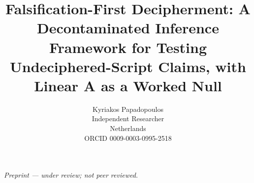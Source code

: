 
\ifanon
  \newcommand{\artref}{the artifact}
  \newcommand{\artobj}{the artifact}
\else
  \newcommand{\artref}{logos v0.1.0}
  \newcommand{\artobj}{the logos artifact (v0.1.0)}
\fi

\ifanon
\else
\fi

\title{Falsification-First Decipherment: A Decontaminated Inference
Framework for Testing Undeciphered-Script Claims, with Linear A as a
Worked Null}

\ifanon
  \author{}
\else
  \author{
    Kyriakos Papadopoulos \\
    Independent Researcher \\
    Netherlands \\
    ORCID 0009-0003-0995-2518
  }
\fi

\date{}


\maketitle
\ifanon\else
\begin{center}\small\emph{Preprint --- under review; not peer
reviewed.}\end{center}
\fi

